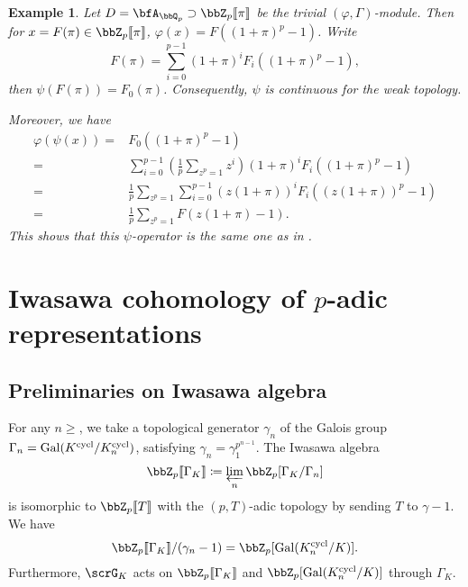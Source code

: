 \documentclass[a4paper,oneside]{amsart}
\newtheorem{example}[theorem]{Example}
\numberwithin{equation}{section}
\numberwithin{figure}{section}
\begin{document}
\begin{example}\label{eg:57892}
    Let $D=\bfA_{\bbQ_p}\supset \bbZ_p\llbracket \pi\rrbracket$ be the trivial $(\varphi,\Gamma)$-module. Then for $x=F(\pi)\in\bbZ_p\llbracket\pi\rrbracket$, $\varphi(x)=F((1+\pi)^p-1)$. Write
    $$F(\pi)=\sum_{i=0}^{p-1}(1+\pi)^i F_i((1+\pi)^p-1),$$
    then $\psi(F(\pi))=F_0(\pi)$. Consequently, $\psi$ is continuous for the weak topology.

    Moreover, we have
    \begin{equation}
        \begin{aligned}
            \varphi(\psi(x))= & F_0((1+\pi)^p-1)                                                                  \\
            =                 & \sum_{i=0}^{p-1}\left(\frac{1}{p}\sum_{z^p=1}z^i\right)(1+\pi)^i F_i((1+\pi)^p-1) \\
            =                 & \frac{1}{p}\sum_{z^p=1}\sum_{i=0}^{p-1}(z(1+\pi))^i F_i((z(1+\pi))^p-1)           \\
            =                 & \frac{1}{p}\sum_{z^p=1}F(z(1+\pi)-1).
        \end{aligned}
    \end{equation}
    This shows that this $\psi$-operator is the same one as in \cite[Proposition 2.2.3]{coates_cyclotomic_2006}.
\end{example}


\section{Iwasawa cohomology of $p$-adic representations}
\subsection{Preliminaries on Iwasawa algebra}
For any $n\geq $, we take a topological generator $\gamma_n$ of the Galois group $\Gamma_n=\operatorname{Gal}(K^{\operatorname{cycl}}/K_n^{\operatorname{cycl}})$, satisfying $\gamma_n=\gamma_1^{p^{n-1}}$. The Iwasawa algebra
$$\bbZ_p\llbracket\Gamma_K\rrbracket\coloneqq \varprojlim_n \bbZ_p[\Gamma_K/\Gamma_n]$$
is isomorphic to $\bbZ_p\llbracket T\rrbracket$ with the $(p,T)$-adic topology by sending $T$ to $\gamma-1$. We have
$$\bbZ_p\llbracket \Gamma_K\rrbracket/(\gamma_n-1)=\bbZ_p[\opn{Gal}(K_n^{\opn{cycl}}/K)].$$
Furthermore, $\scrG_K$ acts on $\bbZ_p\llbracket\Gamma_K\rrbracket$ and $\bbZ_p[\opn{Gal}(K_n^{\opn{cycl}}/K)]$ through $\Gamma_K$.
\end{document}
